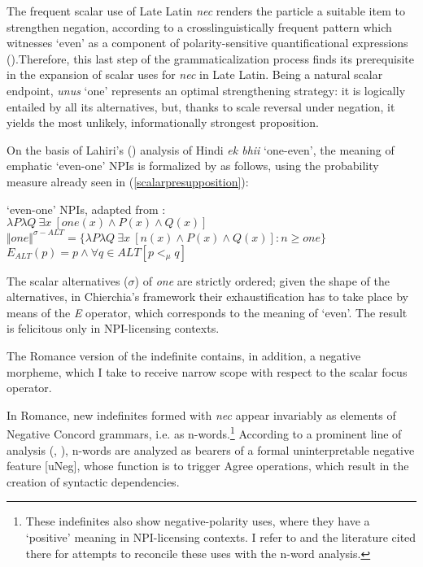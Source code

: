 \documentclass[output=paper,modfonts,nonflat,citecolor=brown,
showindex
]{langsci/langscibook}
\begin{document}
The frequent scalar use of Late Latin {\emph{nec}} renders the particle a suitable item to strengthen negation, according to a crosslinguistically frequent pattern which witnesses `even' as a component of polarity-sensitive quantificational expressions (\citealt[]{Haspelmath97, Lahiri98, Watanabe04, Chierchia13}).Therefore, this last step of the grammaticalization process finds its prerequisite in the expansion of scalar uses for {\emph{nec}} in Late Latin. Being a natural scalar endpoint, {\emph{unus}} `one' represents an optimal strengthening strategy: it is logically entailed by all its alternatives, but, thanks to scale reversal under negation, it yields the most unlikely, informationally strongest proposition. 

On the basis of Lahiri's (\citeyear{Lahiri98}) analysis of Hindi {\emph{ek bhii}} `one-even', the meaning of emphatic `even-one' NPIs is formalized by \citet[156]{Chierchia13} as follows, using the probability measure already seen in (\ref{scalarpresupposition}):

{\begin{exe}
\ex
\begin{xlist}
\ex \label{evenoneNPIChierchia} `even-one' NPIs, adapted from \citet[156]{Chierchia13}:\\ 
$\lambda P \lambda Q \ \exists x \ [one(x) \wedge P(x) \wedge Q(x) ]$\\
$\Vert one \Vert^{\sigma-ALT} = \{ \lambda P \lambda Q \ \exists x \ [n(x) \wedge P(x) \wedge Q(x)]: n \geq one \}$
\ex $ E_{ALT}(p) = p \wedge \forall q \in ALT [p <_{\mu} q]$
\end{xlist}
\end{exe}}

\noindent The scalar alternatives ($\sigma$) of {\emph{one}} are strictly ordered; given the shape of the alternatives, in Chierchia's framework their exhaustification has to take place by means of the {\emph{E}} operator, which corresponds to the meaning of `even'. The result is felicitous only in NPI-licensing contexts.

The Romance version of the indefinite contains, in addition, a negative morpheme, which I take to receive narrow scope with respect to the scalar focus operator.

In Romance, new indefinites formed with {\emph{nec}} appear invariably as elements of Negative Concord grammars, i.e. as n-words.{\footnote{These indefinites also show negative-polarity uses, where they have a `positive' meaning in NPI-licensing contexts. I refer to \citet[chapter 5]{Gianollo18} and the literature cited there for attempts to reconcile these uses with the n-word analysis.}} 
According to a prominent line of analysis (\citealt[]{Zeijlstra04, Zeijlstra14}, \citealt[]{Penka11}), n-words are analyzed as bearers of a formal uninterpretable negative feature [uNeg], whose function is to trigger Agree operations, which result in the creation of syntactic dependencies. 
\end{document}
